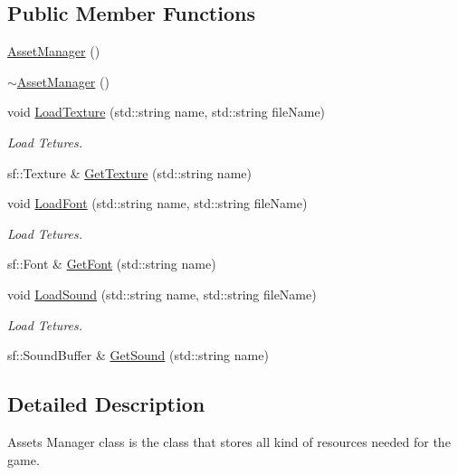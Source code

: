 \subsection*{Public Member Functions}
\begin{DoxyCompactItemize}
\item 
\mbox{\hyperlink{classAssetManager_a750ae7b39b633fbb6594443aa3ca704b}{Asset\+Manager}} ()
\item 
\mbox{\hyperlink{classAssetManager_a9c89817cbf3516f1451c116e89f47d30}{$\sim$\+Asset\+Manager}} ()
\item 
void \mbox{\hyperlink{classAssetManager_ada0c8171d6f0224c261080c04d954538}{Load\+Texture}} (std\+::string name, std\+::string file\+Name)
\begin{DoxyCompactList}\small\item\em Load Tetures. \end{DoxyCompactList}\item 
sf\+::\+Texture \& \mbox{\hyperlink{classAssetManager_aa72940e5dfecd91ff8c5a46ff0b4dfea}{Get\+Texture}} (std\+::string name)
\item 
void \mbox{\hyperlink{classAssetManager_a117f5cea9212e486210fb06dca8aa15a}{Load\+Font}} (std\+::string name, std\+::string file\+Name)
\begin{DoxyCompactList}\small\item\em Load Tetures. \end{DoxyCompactList}\item 
sf\+::\+Font \& \mbox{\hyperlink{classAssetManager_ac098205eb77fec60842b439215bf4c4f}{Get\+Font}} (std\+::string name)
\item 
void \mbox{\hyperlink{classAssetManager_a057918a0150c70d7c3c4eb72e7531ec7}{Load\+Sound}} (std\+::string name, std\+::string file\+Name)
\begin{DoxyCompactList}\small\item\em Load Tetures. \end{DoxyCompactList}\item 
sf\+::\+Sound\+Buffer \& \mbox{\hyperlink{classAssetManager_ad2a21b7f91975c3b74fd4c2c897d4601}{Get\+Sound}} (std\+::string name)
\end{DoxyCompactItemize}


\subsection{Detailed Description}
Assets Manager class is the class that stores all kind of resources needed for the game. 

